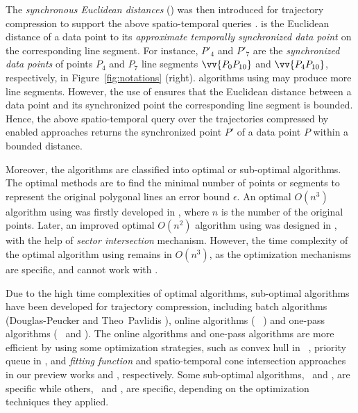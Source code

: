 The \emph{synchronous Euclidean distances} (\sed) was then introduced for trajectory compression to support the above spatio-temporal queries \cite{Meratnia:Spatiotemporal}. \sed is the Euclidean distance of a data point to its \emph{approximate temporally synchronized data point \cite{Meratnia:Spatiotemporal}} on the corresponding line segment. For instance, $P'_4$ and $P'_7$ are the \emph{synchronized data points} of points $P_4$ and $P_7$ \wrt line segments $\vv{P_0P_{10}}$ and $\vv{P_4P_{10}}$, respectively, in Figure~\ref{fig:notations} (right).
\lsa algorithms using \sed may produce more line segments. However, the use of \sed ensures that the Euclidean distance between a data point and its  synchronized point \wrt the corresponding line segment is bounded. Hence, the above spatio-temporal query over the trajectories compressed by \sed enabled approaches returns the synchronized point $P'$ of a data point $P$ within a bounded distance.

Moreover, the \lsa algorithms are classified into optimal or sub-optimal algorithms. %
The optimal methods are to find the minimal number of points or segments to represent the original polygonal lines \wrt an error bound $\epsilon$.
An optimal $O(n^3)$ \lsa algorithm using \ped was firstly developed in \cite{Imai:Optimal},  where $n$ is the number of the original points.
%
Later, an improved optimal  $O(n^2)$  algorithm using \ped was designed in \cite{Chan:Optimal}, with the help of \textit{sector intersection} mechanism.
However, the time complexity of the optimal \lsa algorithm using \sed remains in $O(n^3)$, as the optimization mechanisms are \ped specific, and cannot work with \sed.

Due to the high time complexities of optimal \lsa algorithms, sub-optimal \lsa algorithms have been developed for trajectory compression, including batch algorithms (\eg Douglas-Peucker \cite{Douglas:Peucker, Meratnia:Spatiotemporal} and Theo~Pavlidis \cite{Pavlidis:Segment}), online algorithms (\eg~\bqsa\cite{Liu:BQS} \squishe \cite{Muckell:Compression}) and one-pass algorithms (\eg~\operb \cite{Lin:Operb} and \cised \cite{Lin:Cised}). The online algorithms and one-pass algorithms are more efficient by using some optimization strategies, such as convex hull in \bqsa~\cite{Liu:BQS}, priority queue in \squishe \cite{Muckell:Compression}, and \textit{fitting function} and spatio-temporal cone intersection approaches in our preview works \operb \cite {Lin:Operb} and \cia \cite {Lin:Cised}, respectively. Some sub-optimal algorithms, \eg ~\bqsa and \operb, are \ped specific while others, \eg~\squishe and \cia, are \sed specific, depending on the optimization techniques they applied.


